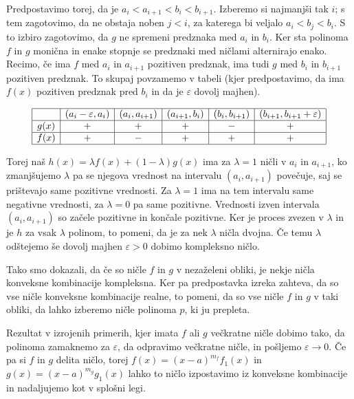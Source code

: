 \begin{dokaz}
    Predpostavimo torej, da je \(a_i < a_{i+1} < b_i < b_{i+1}\). Izberemo si najmanjši tak \(i\); s tem zagotovimo, da ne obstaja noben \(j<i\), za katerega bi veljalo \(a_i < b_j < b_i\). S to izbiro zagotovimo, da \(g\) ne spremeni predznaka med \(a_i\) in \(b_i\). Ker sta polinoma \(f\) in \(g\) monična in enake stopnje se predznaki med ničlami alternirajo enako. Recimo, če ima \(f\) med \(a_i\) in \(a_{i+1}\) pozitiven predznak, ima tudi \(g\) med \(b_i\) in \(b_{i+1}\) pozitiven predznak. To skupaj povzamemo v tabeli (kjer predpostavimo, da ima \(f(x)\) pozitiven predznak pred \(b_i\) in da je \(\varepsilon\) dovolj majhen).
    \begin{center}
        \begin{align*}
            \begin{array}{|c|c|c|c|c|c|}
                \hline
                     & (a_i - \varepsilon, a_i) & (a_i, a_{i+1}) & (a_{i+1}, b_i) & (b_i, b_{i+1}) & (b_{i+1}, b_{i+1} + \varepsilon) \\ \hline
                g(x) & +                        & +          & +          & -          & +                        \\ \hline
                f(x) & +                        & -          & +          & +          & +                        \\ \hline
            \end{array}
        \end{align*}
    \end{center}
    Torej naš \(h(x)=\lambda f(x) + (1-\lambda) g(x)\) ima za \(\lambda = 1\) ničli v \(a_i\) in \(a_{i+1}\), ko zmanjšujemo \(\lambda\) pa se njegova vrednost na intervalu \((a_i, a_{i+1})\) povečuje, saj se prištevajo same pozitivne vrednosti. Za \(\lambda=1\) ima na tem intervalu same negativne vrednosti, za \(\lambda=0\) pa same pozitivne. Vrednosti izven intervala \((a_i, a_{i+1})\) so začele pozitivne in končale pozitivne. Ker je proces zvezen v \(\lambda\) in je \(h\) za vsak \(\lambda\) polinom, to pomeni, da je za nek \(\lambda\) ničla dvojna. Če temu \(\lambda\) odštejemo še dovolj majhen \(\varepsilon>0\) dobimo kompleksno ničlo.

    Tako smo dokazali, da če so ničle \(f\) in \(g\) v nezaželeni obliki, je nekje ničla konveksne kombinacije kompleksna. Ker pa predpostavka izreka zahteva, da so vse ničle konveksne kombinacije realne, to pomeni, da so vse ničle \(f\) in \(g\) v taki obliki, da lahko izberemo ničle polinoma \(p\), ki ju prepleta.

    Rezultat v izrojenih primerih, kjer imata \(f\) ali \(g\) večkratne ničle dobimo tako, da polinoma zamaknemo za \(\varepsilon\), da odpravimo večkratne ničle, in pošljemo \(\varepsilon\to 0\). Če pa si \(f\) in \(g\) delita ničlo, torej \(f(x) = (x-a)^{m_f} f_1(x)\) in \(g(x) = (x-a)^{m_g} g_1(x)\) lahko to ničlo izpostavimo iz konveksne kombinacije in nadaljujemo kot v splošni legi. 
\end{dokaz}

